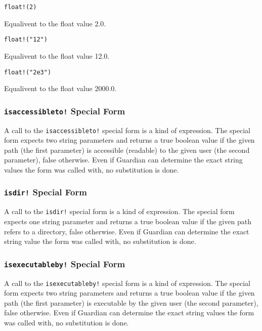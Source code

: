 {{		\begin{itemize}
		{
			\item[] \texttt{float!(2)}
			
				Equalivent to the float value 2.0.
			
			\item[] \texttt{float!("12")}
			
				Equalivent to the float value 12.0.
			
			\item[] \texttt{float!("2e3")}
			
				Equalivent to the float value 2000.0.
		}
		\end{itemize}
	}
	
	\subsubsection{\texttt{isaccessibleto!} Special Form}
	{
		A call to the \texttt{isaccessibleto!} special form
		is a kind of expression.
		The special form expects two string parameters and returns a true boolean
		value if the given path (the first parameter) is accessible (readable) to
		the given user (the second parameter), false
		otherwise.
		Even if Guardian can determine the exact string values the form was
		called with, no substitution is done.
	}
	
	\subsubsection{\texttt{isdir!} Special Form}
	{
		A call to the \texttt{isdir!} special form is a kind of expression.
		The special form expects one string parameter and returns a true boolean
		value if the given path refers to a directory, false
		otherwise.
		Even if Guardian can determine the exact string value the form was
		called with, no substitution is done.
	}
	
	\subsubsection{\texttt{isexecutableby!} Special Form}
	{
		A call to the \texttt{isexecutableby!} special form
		is a kind of expression.
		The special form expects two string parameters and returns a true boolean
		value if the given path (the first parameter) is executable by
		the given user (the second parameter), false
		otherwise.
		Even if Guardian can determine the exact string values the form was
		called with, no substitution is done.
	}

}
